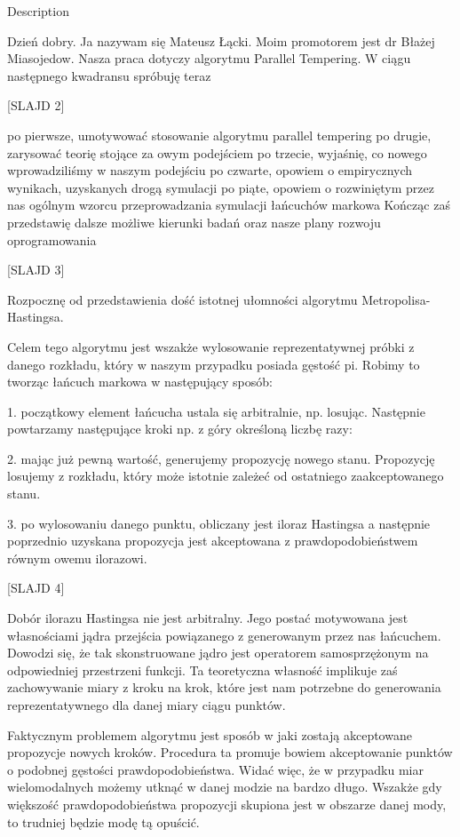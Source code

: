 Description

Dzień dobry. Ja nazywam się Mateusz Łącki. Moim promotorem jest dr Błażej Miasojedow. Nasza praca dotyczy algorytmu Parallel Tempering. W ciągu następnego kwadransu spróbuję teraz

[SLAJD 2]

	po pierwsze, 	umotywować stosowanie algorytmu parallel tempering
	po drugie, 	 	zarysować teorię stojące za owym podejściem
	po trzecie, 	wyjaśnię, co nowego wprowadziliśmy w naszym podejściu
	po czwarte,  	opowiem o empirycznych wynikach, uzyskanych drogą symulacji
	po piąte, 	 	opowiem o rozwiniętym przez nas ogólnym wzorcu  przeprowadzania symulacji łańcuchów markowa
	Kończąc zaś 	przedstawię dalsze możliwe kierunki badań oraz nasze plany rozwoju oprogramowania

[SLAJD 3]

Rozpocznę od przedstawienia dość istotnej ułomności algorytmu Metropolisa-Hastingsa. 

Celem tego algorytmu jest wszakże wylosowanie reprezentatywnej próbki z danego rozkładu, który w naszym przypadku posiada gęstość pi. Robimy to tworząc łańcuch markowa w następujący sposób: 

1. początkowy element łańcucha ustala się arbitralnie, np. losując. Następnie powtarzamy następujące kroki np. z góry określoną liczbę razy:

2. mając już pewną wartość, generujemy propozycję nowego stanu. Propozycję losujemy z rozkładu, który może istotnie zależeć od ostatniego zaakceptowanego  stanu. 

3. po wylosowaniu danego punktu, obliczany jest iloraz Hastingsa a następnie poprzednio uzyskana propozycja jest akceptowana z prawdopodobieństwem równym owemu ilorazowi. 

[SLAJD 4]

Dobór ilorazu Hastingsa nie jest arbitralny. Jego postać motywowana jest  własnościami jądra przejścia powiązanego z generowanym przez nas łańcuchem. Dowodzi się, że tak skonstruowane jądro jest operatorem samosprzężonym na odpowiedniej przestrzeni funkcji. Ta teoretyczna własność implikuje zaś zachowywanie miary z kroku na krok, które jest nam potrzebne do generowania reprezentatywnego dla danej miary ciągu punktów. 

Faktycznym problemem algorytmu jest sposób w jaki zostają akceptowane propozycje nowych kroków. Procedura ta promuje bowiem akceptowanie punktów o podobnej gęstości prawdopodobieństwa. Widać więc, że w przypadku miar wielomodalnych możemy utknąć w danej modzie na bardzo długo. Wszakże gdy większość prawdopodobieństwa propozycji skupiona jest w obszarze danej mody, to trudniej będzie modę tą opuścić.  

